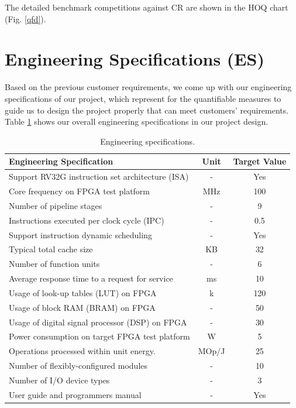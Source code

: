 The detailed benchmark competitions against CR are shown in the HOQ chart (Fig. \ref{qfd}).


\section{Engineering Specifications (ES)}
Based on the previous customer requirements, we come up with our engineering specifications of our project, which represent for the quantifiable measures to guide us to design the project properly that can meet customers' requirements. Table \ref{es} shows our overall engineering specifications in our project design.

\begin{table}[!htp]
\centering
\begin{tabular}{lcc}
\hline
\textbf{Engineering Specification} & \textbf{Unit} & \textbf{Target Value} \\
\hline
Support RV32G instruction set architecture (ISA) & -     & Yes          \\
Core frequency on FPGA test platform             & MHz   & 100          \\
Number of pipeline stages                        & -     & 9            \\
Instructions executed per clock cycle (IPC)      & -     & 0.5          \\
Support instruction dynamic scheduling           & -     & Yes          \\
Typical total cache size                         & KB    & 32           \\
Number of function units                         & -     & 6            \\
Average response time to a request for service   & ms    & 10           \\
Usage of look-up tables (LUT) on FPGA            & k     & 120          \\
Usage of block RAM (BRAM) on FPGA                & -     & 50           \\
Usage of digital signal processor (DSP) on FPGA  & -     & 30           \\
Power consumption on target FPGA test platform   & W     & 5            \\
Operations processed within unit energy.         & MOp/J & 25           \\
Number of flexibly-configured modules            & -     & 10           \\
Number of I/O device types                       & -     & 3            \\
User guide and programmers manual                & -     & Yes          \\
\hline
\end{tabular}
\caption{Engineering specifications.}
\label{es}
\end{table}

